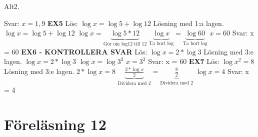 \documentclass[a4paper,11pt]{article}
\begin{document}
\begin{flushleft}
Alt2.\newline

Svar: $ x = 1,9$
\newline\newline
\textbf{EX5}\newline
Lös: $\log{x} = \log{5}+\log{12}$\newline
Lösning med 1:a lagen.\newline\newline
$ \log{x} = \log{5}+\log{12} $\newline
$ \log{x} = \underbrace{\log{5*12}}_{\text{Gör om log12 till 12}} $ \newline\newline
$ \underbrace{\log{x}}_{\text{Ta bort log}} = \underbrace{\log{60}}_{\text{Ta bort log}}  $\newline\newline
$ x = 60$\newline
Svar: x = 60
\newline\newline
\textbf{EX6 - KONTROLLERA SVAR}\newline
Lös: $\log{x} = 2*\log{3}$\newline
Lösning med 3:e lagen. \newline\newline
$ \log{x} = 2*\log{3} $\newline
$ \log{x} = \log{3^2} $ \newline\newline
$ x = 3^2 $\newline\newline
Svar: x = 60
\newline\newline
\textbf{EX7}\newline
Lös: $\log{x^2} = 8$\newline
Lösning med 3:e lagen. \newline\newline
$ 2*\log{x} = 8 $\newline\newline
$ \underbrace{\frac{2*\log{x}}{2}}_{\text{Dividera med 2}} = \underbrace{\frac{8}{2}}_{\text{Dividera med 2}}  $ \newline\newline
$ \log{x} = 4 $\newline\newline
Svar: x = 4
\section{Föreläsning 12}

\end{flushleft}
\end{document}
